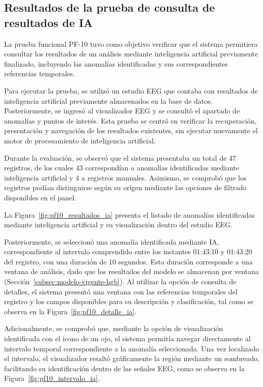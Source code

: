 \FloatBarrier


\subsection{Resultados de la prueba de consulta de resultados de IA}

La prueba funcional PF-10 tuvo como objetivo verificar que el sistema permitiera consultar los resultados de un análisis mediante inteligencia artificial previamente finalizado, incluyendo las anomalías identificadas y sus correspondientes referencias temporales.


Para ejecutar la prueba, se utilizó un estudio EEG que contaba con resultados de inteligencia artificial previamente almacenados en la base de datos. Posteriormente, se ingresó al visualizador EEG y se consultó el apartado de anomalías y puntos de interés. Esta prueba se centró en verificar la recuperación, presentación y navegación de los resultados existentes, sin ejecutar nuevamente el motor de procesamiento de inteligencia artificial.


Durante la evaluación, se observó que el sistema presentaba un total de 47 registros, de los cuales 43 correspondían a anomalías identificadas mediante inteligencia artificial y 4 a registros manuales. Asimismo, se comprobó que los registros podían distinguirse según su origen mediante las opciones de filtrado disponibles en el panel.


La Figura~\ref{fig:pf10_resultados_ia} presenta el listado de anomalías identificadas mediante inteligencia artificial y su visualización dentro del estudio EEG.

Posteriormente, se seleccionó una anomalía identificada mediante IA, correspondiente al intervalo comprendido entre los instantes 01:43:10 y 01:43:20 del registro, con una duración de 10 segundos. Esta duración corresponde a una ventana de análisis, dado que los resultados del modelo se almacenan por ventana (Sección~\ref{subsec:modelo-vigente-hgb}). Al utilizar la opción de consulta de detalles, el sistema presentó una ventana con las referencias temporales del registro y los campos disponibles para su descripción y clasificación, tal como se observa en la Figura~\ref{fig:pf10_detalle_ia}.

Adicionalmente, se comprobó que, mediante la opción de visualización identificada con el icono de un ojo, el sistema permitía navegar directamente al intervalo temporal correspondiente a la anomalía seleccionada. Una vez localizado el intervalo, el visualizador resaltó gráficamente la región mediante un sombreado, facilitando su identificación dentro de las señales EEG, como se observa en la Figura~\ref{fig:pf10_intervalo_ia}.

